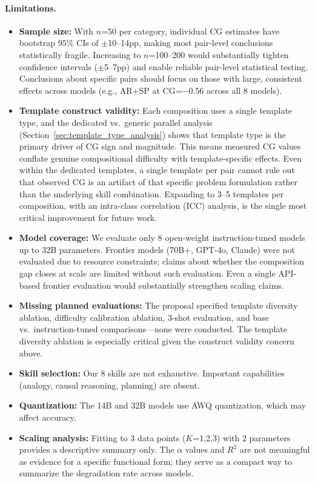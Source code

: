 \documentclass{article}
\begin{document}
\paragraph{Limitations.}

\begin{itemize}
    \item \textbf{Sample size:} With $n$=50 per category, individual CG estimates have bootstrap 95\% CIs of $\pm$10--14pp, making most pair-level conclusions statistically fragile. Increasing to $n$=100--200 would substantially tighten confidence intervals ($\pm$5--7pp) and enable reliable pair-level statistical testing. Conclusions about specific pairs should focus on those with large, consistent effects across models (e.g., AR+SP at CG=$-$0.56 across all 8 models).
    \item \textbf{Template construct validity:} Each composition uses a single template type, and the dedicated vs.\ generic parallel analysis (Section~\ref{sec:template_type_analysis}) shows that template type is the primary driver of CG sign and magnitude. This means measured CG values conflate genuine compositional difficulty with template-specific effects. Even within the dedicated templates, a single template per pair cannot rule out that observed CG is an artifact of that specific problem formulation rather than the underlying skill combination. Expanding to 3--5 templates per composition, with an intra-class correlation (ICC) analysis, is the single most critical improvement for future work.
    \item \textbf{Model coverage:} We evaluate only 8 open-weight instruction-tuned models up to 32B parameters. Frontier models (70B+, GPT-4o, Claude) were not evaluated due to resource constraints; claims about whether the composition gap closes at scale are limited without such evaluation. Even a single API-based frontier evaluation would substantially strengthen scaling claims.
    \item \textbf{Missing planned evaluations:} The proposal specified template diversity ablation, difficulty calibration ablation, 3-shot evaluation, and base vs.\ instruction-tuned comparisons---none were conducted. The template diversity ablation is especially critical given the construct validity concern above.
    \item \textbf{Skill selection:} Our 8 skills are not exhaustive. Important capabilities (analogy, causal reasoning, planning) are absent.
    \item \textbf{Quantization:} The 14B and 32B models use AWQ quantization, which may affect accuracy.
    \item \textbf{Scaling analysis:} Fitting to 3 data points ($K$=1,2,3) with 2 parameters provides a descriptive summary only. The $\alpha$ values and $R^2$ are not meaningful as evidence for a specific functional form; they serve as a compact way to summarize the degradation rate across models.
\end{itemize}
\end{document}
